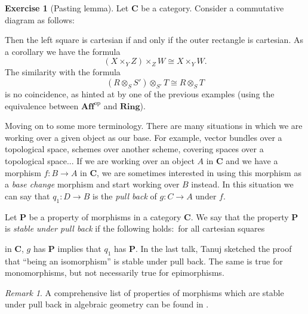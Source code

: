 \documentclass[12pt,reqno,a4paper]{amsart}
\theoremstyle{plain}
\theoremstyle{definition}
\newtheorem{xca}[thm]{Exercise}
\theoremstyle{remark}
\newtheorem{rem}[thm]{Remark}
\begin{document}
\begin{xca}[Pasting lemma]
  Let $\mathbf{C}$ be a category.
  Consider a commutative diagram as follows:
  \begin{center}
  \end{center}
  Then the left square is cartesian if and only if the outer rectangle is cartesian.
  As a corollary we have the formula
  \[ (X \times_{Y} Z) \times_{Z} W \cong X \times_{Y} W. \]
  The similarity with the formula
  \[ (R \otimes_{S} S') \otimes_{S'} T \cong R \otimes_{S} T \]
  is no coincidence, as hinted at by one of the previous examples (using the equivalence between $\mathbf{Aff}^{\mathrm{op}}$ and $\mathbf{Ring}$).
\end{xca}

Moving on to some more terminology.
There are many situations in which we are working over a given object as our base.
For example, vector bundles over a topological space, schemes over another scheme, covering spaces over a topological space...
If we are working over an object $A$ in $\mathbf{C}$ and we have a morphism $f \colon B \to A$ in $\mathbf{C}$, we are sometimes interested in using this morphism as a \textit{base change} morphism and start working over $B$ instead.
In this situation we can say that $q_{1} \colon D \to B$ is the \textit{pull back} of $g \colon C \to A$ under $f$.

Let $\mathbf{P}$ be a property of morphisms in a category $\mathbf{C}$.
We say that the property $\mathbf{P}$ is \textit{stable under pull back} if the following holds:~for all cartesian squares
\begin{center}
\end{center}
in $\mathbf{C}$, $g$ has $\mathbf{P}$ implies that $q_{1}$ has $\mathbf{P}$.
In the last talk, Tanuj sketched the proof that ``being an isomorphism'' is stable under pull back.
The same is true for monomorphisms, but not necessarily true for epimorphisms.

\begin{rem}
  A comprehensive list of properties of morphisms which are stable under pull back in algebraic geometry can be found in \cite[Appendix C]{gw10}.
\end{rem}
\end{document}
